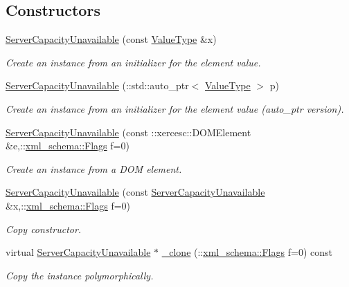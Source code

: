 \subsection*{Constructors}
\begin{DoxyCompactItemize}
\item 
\hyperlink{classopenstack_1_1xml_1_1ServerCapacityUnavailable_aa3a427a87f5fdfb54aef5480bff9eb4c}{ServerCapacityUnavailable} (const \hyperlink{classopenstack_1_1xml_1_1ServerCapacityUnavailableAPIFault}{ValueType} \&x)
\begin{DoxyCompactList}\small\item\em Create an instance from an initializer for the element value. \item\end{DoxyCompactList}\item 
\hyperlink{classopenstack_1_1xml_1_1ServerCapacityUnavailable_af838865b8a44996f6aa62f44806561a3}{ServerCapacityUnavailable} (::std::auto\_\-ptr$<$ \hyperlink{classopenstack_1_1xml_1_1ServerCapacityUnavailableAPIFault}{ValueType} $>$ p)
\begin{DoxyCompactList}\small\item\em Create an instance from an initializer for the element value (auto\_\-ptr version). \item\end{DoxyCompactList}\item 
\hyperlink{classopenstack_1_1xml_1_1ServerCapacityUnavailable_a766edb0f39a3710019c1c04fa0d50dc2}{ServerCapacityUnavailable} (const ::xercesc::DOMElement \&e,::\hyperlink{namespacexml__schema_affb4c227cbd9aa7453dd1dc5a1401943}{xml\_\-schema::Flags} f=0)
\begin{DoxyCompactList}\small\item\em Create an instance from a DOM element. \item\end{DoxyCompactList}\item 
\hyperlink{classopenstack_1_1xml_1_1ServerCapacityUnavailable_a4fd7abb16231c7b0413ba61f79de7738}{ServerCapacityUnavailable} (const \hyperlink{classopenstack_1_1xml_1_1ServerCapacityUnavailable}{ServerCapacityUnavailable} \&x,::\hyperlink{namespacexml__schema_affb4c227cbd9aa7453dd1dc5a1401943}{xml\_\-schema::Flags} f=0)
\begin{DoxyCompactList}\small\item\em Copy constructor. \item\end{DoxyCompactList}\item 
virtual \hyperlink{classopenstack_1_1xml_1_1ServerCapacityUnavailable}{ServerCapacityUnavailable} $\ast$ \hyperlink{classopenstack_1_1xml_1_1ServerCapacityUnavailable_a12fa2765d9c5cb26e03041c142c52a41}{\_\-clone} (::\hyperlink{namespacexml__schema_affb4c227cbd9aa7453dd1dc5a1401943}{xml\_\-schema::Flags} f=0) const 
\begin{DoxyCompactList}\small\item\em Copy the instance polymorphically. \item\end{DoxyCompactList}\end{DoxyCompactItemize}
